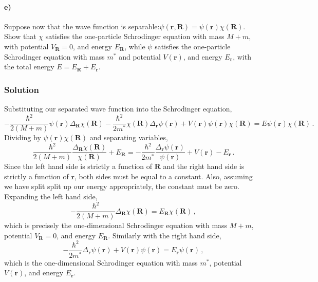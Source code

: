 \documentclass[letterpaper,10pt]{article}
\def\R{\mathbf{R}}
\def\r{\mathbf{r}}
\begin{document}
\paragraph*{e)} Suppose now that the wave function is
separable:$\psi(\r,\R)=\psi(\r)\chi(\R)$. Show that $\chi$ satisfies the
one-particle Schrodinger equation with mass $M+m$, with potential $V_\R=0$, and
energy $E_\R$, while $\psi$ satisfies the one-particle Schrodinger equation
with mass $m^*$ and potential $V(\r)$, and energy $E_\r$, with the total energy
$E=E_\R+E_\r$.
\subsubsection*{Solution}
Substituting our separated wave function into the Schrodinger equation,
\[
-\frac{\hbar^2}{2(M+m)}\psi(\r)\Delta_\R\chi(\R)
-\frac{\hbar^2}{2m^*}\chi(\R)\Delta_\r\psi(\r)+V(\r)\psi(\r)\chi(\R)
=E\psi(\r)\chi(\R)\,.
\]
Dividing by $\psi(\r)\chi(\R)$ and separating variables,
\[
\frac{\hbar^2}{2(M+m)}\frac{\Delta_\R\chi(\R)}{\chi(\R)}+E_\R
=-\frac{\hbar^2}{2m^*}\frac{\Delta_\r\psi(\r)}{\psi(\r)}+V(\r)-E_\r\,.
\]
Since the left hand side is strictly a function of $\R$ and the right hand side
is strictly a function of $\r$, both sides must be equal to a constant. Also,
assuming we have split split up our energy appropriately, the constant must be
zero. Expanding the left hand side,
\[
-\frac{\hbar^2}{2(M+m)}\Delta_\R\chi(\R)=E_\R\chi(\R)\,,
\]
which is precisely the one-dimensional Schrodinger equation with mass $M+m$,
potential $V_\R=0$, and energy $E_\R$. Similarly with the right hand
side,
\[
-\frac{\hbar^2}{2m^*}\Delta_\r\psi(\r)+V(\r)\psi(\r)=E_\r\psi(\r)\,,
\]
which is the one-dimensional Schrodinger equation with mass $m^*$, potential
$V(\r)$, and energy $E_\r$.
\end{document}
